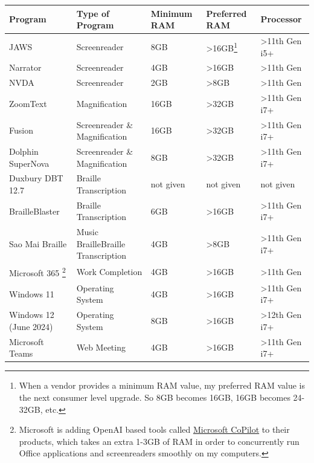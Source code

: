 \documentclass[14pt, letterpaper,twoside]{extreport}
\begin{document}
\begin{longtable}[]{@{}
 >{\raggedright\arraybackslash}p{}
 >{\raggedright\arraybackslash}p{}
 >{\raggedright\arraybackslash}p{}
 >{\raggedright\arraybackslash}p{}
 >{\raggedright\arraybackslash}p{}
 }
\toprule\noalign{}
Program & Type of Program & Minimum RAM & Preferred RAM & \textbf{Processor}
\\
\midrule\noalign{}
\endhead
\bottomrule\noalign{}
\endlastfoot
JAWS & Screenreader & 8GB & \textgreater16GB\footnote{When a vendor provides a minimum RAM value, my preferred RAM value is the next consumer level upgrade. So 8GB becomes 16GB, 16GB becomes 24-32GB, etc.} & \textgreater11th Gen i5+ \\[1em] 
Narrator & Screenreader & 4GB & \textgreater16GB & \textgreater11th Gen \\[1em] 
NVDA & Screenreader & 2GB & \textgreater8GB & \textgreater11th Gen \\[1em] ZoomText & Magnification & 16GB & \textgreater32GB & \textgreater11th Gen i7+ \\[1em] 
Fusion & Screenreader \break \& Magnification & 16GB & \textgreater32GB & \textgreater11th Gen i7+ \\[1em] 
Dolphin SuperNova & Screenreader \break \& Magnification & 8GB & \textgreater32GB & \textgreater11th Gen i7+ \\[1em] 
Duxbury DBT 12.7 & Braille Transcription & not given & not given & not given \\[1em] 
BrailleBlaster & Braille Transcription & 6GB & \textgreater16GB & \textgreater11th Gen i7+ \\[1em] 
Sao Mai Braille & Music Braille\break Braille Transcription & 4GB & \textgreater8GB & \textgreater11th Gen i7+ \\[1em] 
Microsoft 365 \footnote{Microsoft is adding OpenAI based tools called \href{https://www.microsoft.com/en-us/microsoft-365/enterprise/microsoft-365-copilot}{Microsoft CoPilot} to their products, which takes an extra 1-3GB of RAM in order to concurrently run Office applications and screenreaders smoothly on my computers.} & Work Completion & 4GB & \textgreater16GB & \textgreater11th Gen \\[1em] 
Windows 11 & Operating System & 4GB & \textgreater16GB & \textgreater11th Gen i7+ \\[1em] 
Windows 12 (June 2024) & Operating System & 8GB & \textgreater16GB & \textgreater12th Gen i7+ \\[1em] 
Microsoft Teams & Web Meeting & 4GB & \textgreater16GB & \textgreater11th Gen i7+ \\[1em] 

\end{longtable}
\end{document}
